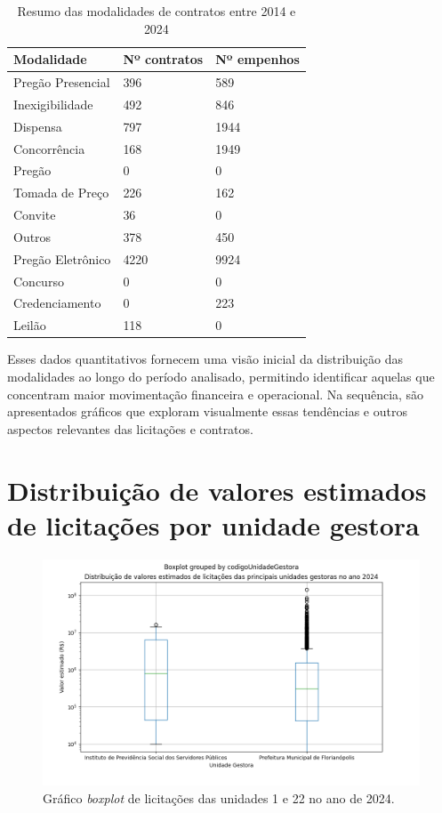 \documentclass[
	12pt,				%
	oneside,			%
	a4paper,			%
	chapter=TITLE,		%
	section=TITLE,		%
	english,			%
	brazil				%
	]{abntex2}
\begin{document}
\begin{table}[h]
	\caption{Resumo das modalidades de contratos entre 2014 e 2024}
	\label{tab:modalidades-contratos}
	\center
	\begin{tabular}{|l|l|l|}
		\hline
		\textbf{Modalidade} & \textbf{Nº contratos} & \textbf{Nº empenhos} \\ \hline
		Pregão Presencial & 396 & 589 \\ \hline
		Inexigibilidade & 492 & 846 \\ \hline
		Dispensa & 797 & 1944 \\ \hline
		Concorrência & 168 & 1949 \\ \hline
		Pregão & 0 & 0 \\ \hline
		Tomada de Preço & 226 & 162 \\ \hline
		Convite & 36 & 0 \\ \hline
		Outros & 378 & 450 \\ \hline
		Pregão Eletrônico & 4220 & 9924 \\ \hline
		Concurso & 0 & 0 \\ \hline
		Credenciamento & 0 & 223 \\ \hline
		Leilão & 118 & 0 \\ \hline
	\end{tabular}
\end{table}

Esses dados quantitativos fornecem uma visão inicial da distribuição das modalidades ao longo do período analisado, permitindo identificar aquelas que concentram maior movimentação financeira e operacional. Na sequência, são apresentados gráficos que exploram visualmente essas tendências e outros aspectos relevantes das licitações e contratos.

\section*{Distribuição de valores estimados de licitações por unidade gestora}

\begin{figure}[h]
	\begin{center}
		\caption{\label{fig:boxplot_licitacoes}Gráfico \textit{boxplot} de licitações das unidades 1 e 22 no ano de 2024.}
		\includegraphics[scale=0.5]{images/boxplot_licitacoes_2024.png} %
	\end{center}
\end{figure}
\end{document}
